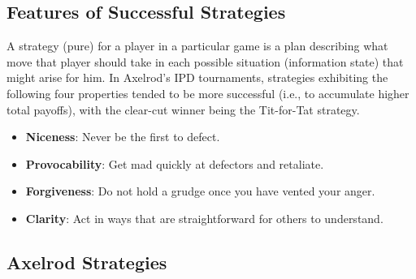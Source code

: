 \documentclass[a4paper]{article}
\begin{document}
	\subsection{Features of Successful Strategies}

A strategy (pure) for a player in a particular game is a plan describing what move that player should take in each possible situation (information state) that might arise for him.
In Axelrod’s IPD tournaments, strategies exhibiting the following four properties tended to be more successful (i.e., to accumulate higher total payoffs), with the clear-cut winner being the Tit-for-Tat strategy.
	\begin{itemize}
		\item \textbf{Niceness}: Never be the first to defect.
		\item \textbf{Provocability}: Get mad quickly at defectors and retaliate.
		\item \textbf{Forgiveness}: Do not hold a grudge once you have vented your anger.
		\item \textbf{Clarity}: Act in ways that are straightforward for others to understand.
	\end{itemize}

	\subsection{Axelrod Strategies}	
\end{document}
